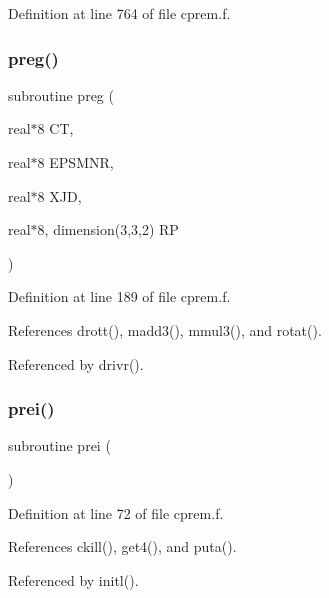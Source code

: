 Definition at line 764 of file cprem.\+f.

\mbox{\label{cprem_8f_a532eba7295b2fd29ded9aabb90b5a646}} 
\subsubsection{\texorpdfstring{preg()}{preg()}}
{\footnotesize\ttfamily subroutine preg (\begin{DoxyParamCaption}\item[{real$\ast$8}]{CT,  }\item[{real$\ast$8}]{E\+P\+S\+M\+NR,  }\item[{real$\ast$8}]{X\+JD,  }\item[{real$\ast$8, dimension(3,3,2)}]{RP }\end{DoxyParamCaption})}



Definition at line 189 of file cprem.\+f.



References drott(), madd3(), mmul3(), and rotat().



Referenced by drivr().

\mbox{\label{cprem_8f_a3e18e670c3f7745523dc759fa5957b4b}} 
\subsubsection{\texorpdfstring{prei()}{prei()}}
{\footnotesize\ttfamily subroutine prei (\begin{DoxyParamCaption}{ }\end{DoxyParamCaption})}



Definition at line 72 of file cprem.\+f.



References ckill(), get4(), and puta().



Referenced by initl().

\mbox{\label{cprem_8f_a6d118ab3a0eb30a4e5ea2e73ed5c6ccc}} 
